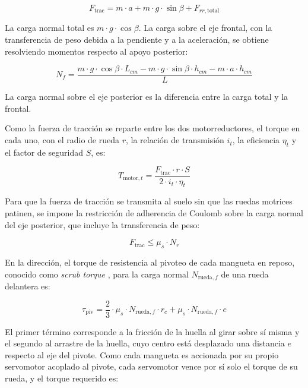 \documentclass[../../General.tex]{subfiles}
\begin{document}
\begin{equation*}
    F_{\text{trac}} = m \cdot a + m \cdot g \cdot \sin \beta + F_{rr,\text{total}}
\end{equation*}

La carga normal total es $m \cdot g \cdot \cos \beta$. La carga sobre el eje frontal, con la transferencia de peso debida a la pendiente y a la aceleración, se obtiene resolviendo momentos respecto al apoyo posterior:

\begin{equation*}
    N_f = \frac{m \cdot g \cdot \cos \beta \cdot L_{cm} - m \cdot g \cdot \sin \beta \cdot h_{cm} - m \cdot a \cdot h_{cm}}{L}
\end{equation*}

La carga normal sobre el eje posterior es la diferencia entre la carga total y la frontal.

Como la fuerza de tracción se reparte entre los dos motorreductores, el torque en cada uno, con el radio de rueda $r$, la relación de transmisión $i_t$, la eficiencia $\eta_t$ y el factor de seguridad $S$, es:

\begin{equation*}
    T_{\text{motor},t} = \frac{F_{\text{trac}} \cdot r \cdot S}{2 \cdot i_t \cdot \eta_t}
\end{equation*}

Para que la fuerza de tracción se transmita al suelo sin que las ruedas motrices patinen, se impone la restricción de adherencia de Coulomb sobre la carga normal del eje posterior, que incluye la transferencia de peso:

\begin{equation*}
    F_{\text{trac}} \le \mu_s \cdot N_r
\end{equation*}

En la dirección, el torque de resistencia al pivoteo de cada mangueta en reposo, conocido como \textit{scrub torque} \citep{jazar2017vehicle}, para la carga normal $N_{\text{rueda},f}$ de una rueda delantera es:

\begin{equation*}
    \tau_{\text{piv}} = \frac{2}{3} \cdot \mu_s \cdot N_{\text{rueda},f} \cdot r_c + \mu_s \cdot N_{\text{rueda},f} \cdot e
\end{equation*}

El primer término corresponde a la fricción de la huella al girar sobre sí misma y el segundo al arrastre de la huella, cuyo centro está desplazado una distancia $e$ respecto al eje del pivote. Como cada mangueta es accionada por su propio servomotor acoplado al pivote, cada servomotor vence por sí solo el torque de su rueda, y el torque requerido es:
\end{document}
